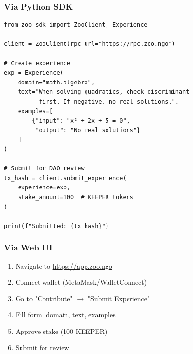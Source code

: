 \subsubsection{Via Python SDK}
\begin{verbatim}
from zoo_sdk import ZooClient, Experience

client = ZooClient(rpc_url="https://rpc.zoo.ngo")

# Create experience
exp = Experience(
    domain="math.algebra",
    text="When solving quadratics, check discriminant
          first. If negative, no real solutions.",
    examples=[
        {"input": "x² + 2x + 5 = 0",
         "output": "No real solutions"}
    ]
)

# Submit for DAO review
tx_hash = client.submit_experience(
    experience=exp,
    stake_amount=100  # KEEPER tokens
)

print(f"Submitted: {tx_hash}")
\end{verbatim}

\subsubsection{Via Web UI}
\begin{enumerate}
\item Navigate to \url{https://app.zoo.ngo}
\item Connect wallet (MetaMask/WalletConnect)
\item Go to "Contribute" $\rightarrow$ "Submit Experience"
\item Fill form: domain, text, examples
\item Approve stake (100 KEEPER)
\item Submit for review
\end{enumerate}

